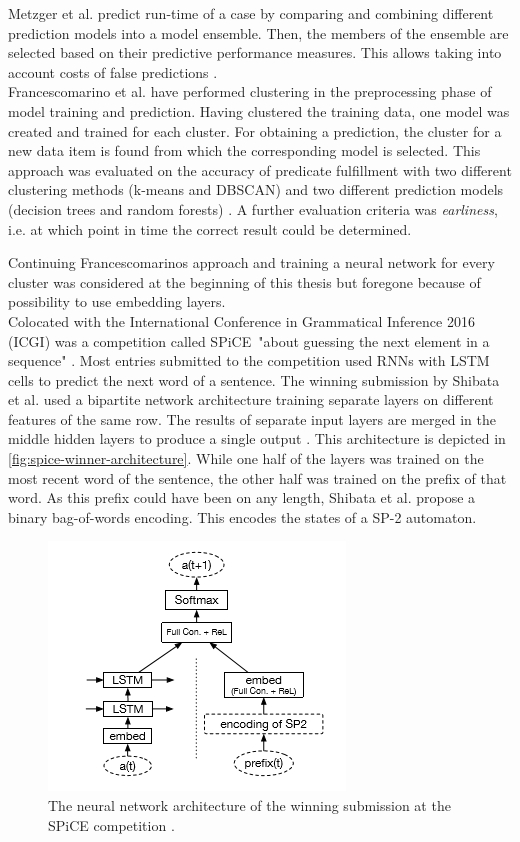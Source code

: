 Metzger et al. predict run-time of a case by comparing and combining different prediction models into a model ensemble. Then, the members of the ensemble are selected based on their predictive performance measures. This allows taking into account costs of false predictions \cite{metzger2015}.\\

Francescomarino et al. have performed clustering in the preprocessing phase of model training and prediction. Having clustered the training data, one model was created and trained for each cluster. For obtaining a prediction, the cluster for a new data item is found from which the corresponding model is selected.
This approach was evaluated on the accuracy of predicate fulfillment with two different clustering methods (k-means and DBSCAN) and two different prediction models (decision trees and random forests) \cite{francescomarino2015}.
A further evaluation criteria was \textit{earliness}, i.e. at which point in time the correct result could be determined.

Continuing Francescomarinos approach and training a neural network for every cluster was considered at the beginning of this thesis but foregone because of possibility to use embedding layers.\\

Colocated with the International Conference in Grammatical Inference 2016 (ICGI) was a competition called SPiCE\ "about guessing the next element in a sequence" \cite{web:spice}.
Most entries submitted to the competition used RNNs with LSTM cells to predict the next word of a sentence.
The winning submission by Shibata et al. used a bipartite network architecture training separate layers on different features of the same row. The results of separate input layers are merged in the middle hidden layers to produce a single output \cite{shibata2016bipartite}. This architecture is depicted in \autoref{fig:spice-winner-architecture}.
While one half of the layers was trained on the most recent word of the sentence, the other half was trained on the prefix of that word. As this prefix could have been on any length, Shibata et al. propose a binary bag-of-words encoding. This encodes the states of a SP-2 automaton.

\begin{figure}
    \centering
    \includegraphics[height=.5\textwidth]{gfx/spice-winner-architecture.png}
    \caption{The neural network architecture of the winning submission at the SPiCE competition \cite{shibata2016bipartite}.}
    \label{fig:spice-winner-architecture}
\end{figure}


